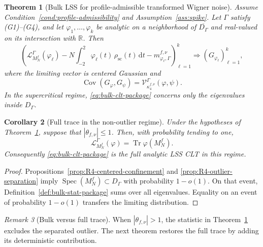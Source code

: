 \documentclass[11pt]{article}
\newtheorem{theorem}{Theorem}[section]
\newtheorem{corollary}[theorem]{Corollary}
\theoremstyle{definition}
\theoremstyle{remark}
\newtheorem{remark}[theorem]{Remark}
\newcommand{\Cov}{\operatorname{Cov}}
\newcommand{\Tr}{\operatorname{Tr}}
\newcommand{\spec}{\operatorname{Spec}}
\newcommand{\scal}{\mathrm{sc}}
\newcommand{\dd}{\mathrm d}
\begin{document}
\begin{theorem}[Bulk LSS for profile-admissible transformed Wigner noise]
\label{thm:bulk-main-package}\label{thm:main}
Assume Condition~\ref{cond:profile-admissibility} and
Assumption~\ref{ass:spike}.  Let \(\Gamma\) satisfy (G1)--(G4), and
let \(\varphi_1,\ldots,\varphi_k\) be analytic on a neighborhood of
\(\overline{D_\Gamma}\) and real-valued on its intersection with
\(\mathbb R\).  Then
\begin{equation}\label{eq:bulk-clt-package}
 \left(
 \mathcal L_{M_N^f}^\Gamma(\varphi_\ell)
 -N\int_{-2}^2\varphi_\ell(t)\,\rho_{\scal}(t)\,\dd t
 -m_{\varphi_\ell,\Gamma}^{f,\nu}
 \right)_{\ell=1}^k
 \Longrightarrow
 (G_{\varphi_\ell})_{\ell=1}^k,
\end{equation}
where the limiting vector is centered Gaussian and
\begin{equation}\label{eq:bulk-cov-package}
 \Cov(G_\varphi,G_\psi)
 =\mathcal V_{\kappa_4^{f,\nu}}^\Gamma(\varphi,\psi).
\end{equation}
In the supercritical regime, \eqref{eq:bulk-clt-package} concerns only the
eigenvalues inside \(D_\Gamma\).
\end{theorem}

\begin{corollary}[Full trace in the non-outlier regime]
\label{cor:subcritical-full-package}
Under the hypotheses of Theorem~\ref{thm:bulk-main-package}, suppose that
\(|\theta_{f,\nu}|\le1\).  Then, with probability tending to one,
\begin{equation}\label{eq:full-equals-bulk-package}
 \mathcal L_{M_N^f}^\Gamma(\varphi)
 =\Tr\varphi(M_N^f).
\end{equation}
Consequently \eqref{eq:bulk-clt-package} is the full analytic LSS CLT in this
regime.
\end{corollary}

\begin{proof}
Propositions~\ref{prop:R4-centered-confinement} and
\ref{prop:R4-outlier-separation} imply
\(\spec(M_N^f)\subset D_\Gamma\) with probability \(1-o(1)\).  On that event,
Definition~\ref{def:bulk-stat-package} sums over all eigenvalues.  Equality on
an event of probability \(1-o(1)\) transfers the limiting distribution.
\end{proof}

\begin{remark}[Bulk versus full trace]
When $|\theta_{f,\nu}|>1$, the statistic in
Theorem~\ref{thm:bulk-main-package} excludes the separated outlier.  The next
theorem restores the full trace by adding its deterministic contribution.
\end{remark}
\end{document}
